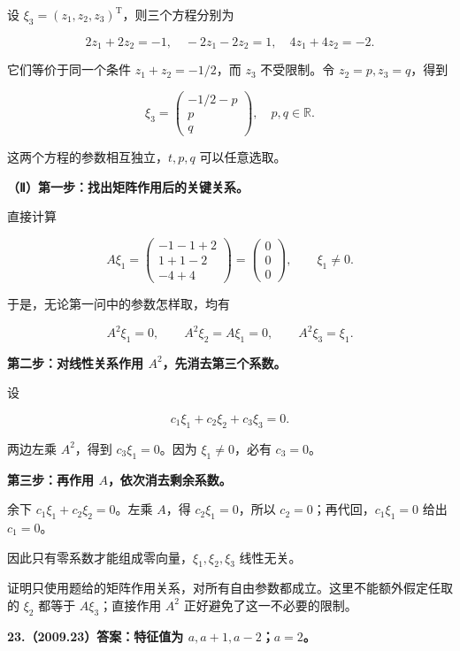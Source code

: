 \documentclass[UTF8,11pt,fontset=windows]{ctexart}
\begin{document}
设 $\xi_3=(z_1,z_2,z_3)^{\mathrm T}$，则三个方程分别为

$$
2z_1+2z_2=-1,\quad-2z_1-2z_2=1,\quad4z_1+4z_2=-2.
$$

它们等价于同一个条件 $z_1+z_2=-1/2$，而 $z_3$ 不受限制。令 $z_2=p,z_3=q$，得到

$$
\boxed{\xi_3=\begin{pmatrix}-1/2-p\\p\\q\end{pmatrix},
\quad p,q\in\mathbb R.}
$$

这两个方程的参数相互独立，$t,p,q$ 可以任意选取。

\textbf{（Ⅱ）第一步：找出矩阵作用后的关键关系。}

直接计算

$$
A\xi_1
=\begin{pmatrix}-1-1+2\\1+1-2\\-4+4\end{pmatrix}
=\begin{pmatrix}0\\0\\0\end{pmatrix},
\qquad\xi_1\ne0.
$$

于是，无论第一问中的参数怎样取，均有

$$
A^2\xi_1=0,\qquad
A^2\xi_2=A\xi_1=0,\qquad
A^2\xi_3=\xi_1.
$$

\textbf{第二步：对线性关系作用 $A^2$，先消去第三个系数。}

设

$$
c_1\xi_1+c_2\xi_2+c_3\xi_3=0.
$$

两边左乘 $A^2$，得到 $c_3\xi_1=0$。因为 $\xi_1\ne0$，必有 $c_3=0$。

\textbf{第三步：再作用 $A$，依次消去剩余系数。}

余下 $c_1\xi_1+c_2\xi_2=0$。左乘 $A$，得 $c_2\xi_1=0$，所以 $c_2=0$；再代回，$c_1\xi_1=0$ 给出 $c_1=0$。

因此只有零系数才能组成零向量，$\boxed{\xi_1,\xi_2,\xi_3\text{ 线性无关}}$。

证明只使用题给的矩阵作用关系，对所有自由参数都成立。这里不能额外假定任取的 $\xi_2$ 都等于 $A\xi_3$；直接作用 $A^2$ 正好避免了这一不必要的限制。

\clearpage

\textbf{23.（2009.23）答案：特征值为 $a,a+1,a-2$；$a=2$。}
\end{document}

